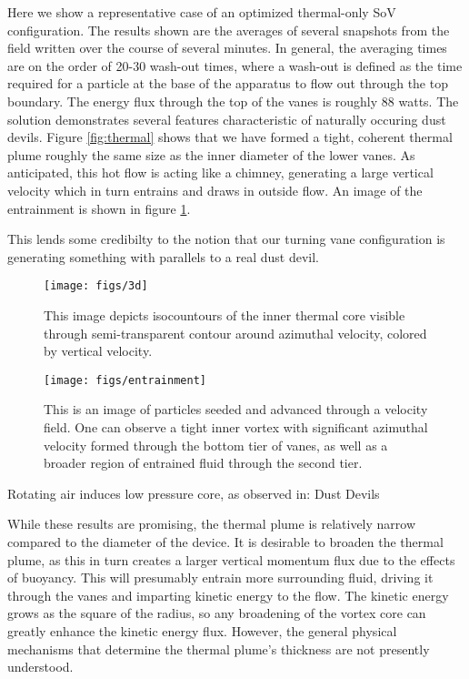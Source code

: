 Here we show a representative case of an optimized thermal-only SoV
configuration. The results shown are the averages of several snapshots
from the field written over the course of several minutes. In general,
the averaging times are on the order of 20-30 wash-out times, where a
wash-out is defined as the time required for a particle at the base of
the apparatus to flow out through the top boundary. The energy flux
through the top of the vanes is roughly 88 watts. The solution
demonstrates several features characteristic of naturally occuring dust
devils. Figure \ref{fig:thermal} shows that we have formed a tight,
coherent thermal plume roughly the same size as the inner diameter of the
lower vanes. As anticipated, this hot flow is acting like a chimney,
generating a large vertical velocity which in turn entrains and draws in
outside flow. An image of the entrainment is shown in figure
\ref{fig:entrain}. 




This lends some credibilty to the notion that our turning vane
configuration is generating something with parallels to a real dust
devil.  


  \begin{figure}[htp]
   
   \centering
   \begin{minipage}{0.47\textwidth}
    \texttt{[image: figs/3d]}
    \caption{This image depicts isocountours of the inner thermal core
    visible through semi-transparent contour around azimuthal velocity,
    colored by vertical velocity. }
   \end{minipage}      
   \label{fig:thermal}  

   \centering   
   \begin{minipage}{0.47\textwidth}
    \texttt{[image: figs/entrainment]}%
    \caption{This is an image of particles seeded and advanced
    through a velocity field. One can observe a tight inner vortex with
    significant azimuthal velocity formed through the bottom tier of
    vanes, as well as a broader region of entrained fluid through the
    second tier.} 
   \end{minipage}   
   \label{fig:entrain}  
  \end{figure}   


Rotating air induces low pressure core, as observed in:
Dust Devils

%
%
While these results are promising, the thermal plume is relatively
narrow compared to the diameter of the device. It is desirable to
broaden the thermal plume, as this in turn creates a larger vertical
momentum flux due to the effects of buoyancy. This will presumably
entrain more surrounding fluid, driving it through the vanes and
imparting kinetic energy to the flow. The kinetic energy grows as the
square of the radius, so any broadening of the vortex core can greatly
enhance the kinetic energy flux. However, the general physical
mechanisms that determine the thermal plume's thickness are not
presently understood. 

